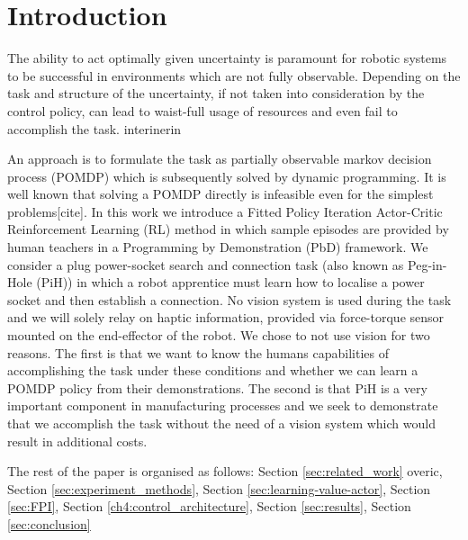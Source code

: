 \documentclass[final,3p,times,twocolumn]{elsarticle}
\begin{document}


\section{Introduction}

The ability to act optimally given uncertainty is paramount for robotic systems to be successful in
environments which are not fully observable. Depending on the task and structure of the uncertainty, 
if not taken into consideration by the control policy, can lead to waist-full usage of resources 
and even fail to accomplish the task. interinerin

An approach is to formulate the task as partially observable markov decision process (POMDP) which is subsequently
solved by dynamic programming. It is well known that solving a POMDP directly is infeasible even for 
the simplest problems[cite]. In this work we introduce a Fitted Policy Iteration Actor-Critic 
Reinforcement Learning (RL) method in which sample episodes are provided by human teachers in 
a Programming by Demonstration (PbD) framework. We consider a plug power-socket search and connection 
task (also known as Peg-in-Hole (PiH)) in which a robot apprentice must learn how to localise a 
power socket and then establish a connection. 
No vision system is used during the task and we will solely relay on haptic information, provided via force-torque sensor mounted on the end-effector 
of the robot. We chose to not use vision for two reasons. The first is that we want to 
know the humans capabilities of accomplishing the task under these conditions and whether 
we can learn a POMDP policy from their demonstrations. The second is that PiH is a very important 
component in manufacturing processes and we seek to demonstrate that we accomplish the task without 
the need of a vision system which would result in additional costs.

The rest of the paper is organised as follows: Section \ref{sec:related_work} overic, 
Section \ref{sec:experiment_methods}, Section \ref{sec:learning-value-actor}, 
Section \ref{sec:FPI}, Section \ref{ch4:control_architecture}, Section \ref{sec:results}, Section \ref{sec:conclusion}
\end{document}
